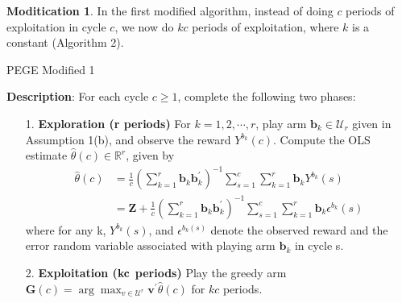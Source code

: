 \documentclass{article}
\theoremstyle{plain}
\theoremstyle{definition}
\newtheorem{modification}{Moditication}
\begin{document}

\begin{modification}
In the first modified algorithm, instead of doing $c$ periods of exploitation in cycle $c$, we now do $kc$ periods of exploitation, where $k$ is a constant (Algorithm 2). 
\begin{algorithm}\label{alg:PEGE1}
\caption{PEGE Modified 1}
\textbf{Description}: For each cycle $c\geq 1$, complete the following two phases:
\begin{itemize}
\item [1. ] \textbf{Exploration (r periods)} For $k=1,2,\cdots,r$, play arm $\textbf{b}_{k}\in \mathcal{U}_{r}$ given in Assumption 1(b), and observe the reward $Y^{b_{k}}(c)$. Compute the OLS estimate $\hat{\theta}(c)\in \mathbb{R}^{r}$, given by
\begin{align}
\hat{\theta}(c)&=\frac{1}{c}(\sum_{k=1}^{r}\textbf{b}_{k}\textbf{b}_{k}^{'})^{-1}\sum_{s=1}^{c}\sum_{k=1}^{r}\textbf{b}_{k}Y^{b_{k}}(s) \nonumber \\
&=\textbf{Z}+\frac{1}{c}(\sum_{k=1}^{r}\textbf{b}_{k}\textbf{b}_{k}^{'})^{-1}\sum_{s=1}^{c}\sum_{k=1}^{r}\textbf{b}_{k}\epsilon^{b_{k}}(s) \nonumber 
\end{align}
where for any k, $Y^{b_{k}}(s)$, and $\epsilon^{b_{k}(s)}$ denote the observed reward and the error random variable associated with playing arm $\textbf{b}_{k}$ in cycle s.
\item [2. ] \textbf{Exploitation ($\bold{kc}$ periods)} Play the greedy arm $\textbf{G}(c)=\arg \max_{v\in \mathcal{U}^{r}}\textbf{v}^{'}\hat{\theta}(c)$ for $kc$ periods.
\end{itemize}
\end{algorithm}

\end{modification}
\end{document}
